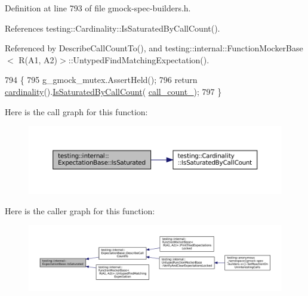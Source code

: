 Definition at line 793 of file gmock-\/spec-\/builders.\+h.



References testing\+::\+Cardinality\+::\+Is\+Saturated\+By\+Call\+Count().



Referenced by Describe\+Call\+Count\+To(), and testing\+::internal\+::\+Function\+Mocker\+Base$<$ R(\+A1, A2)$>$\+::\+Untyped\+Find\+Matching\+Expectation().


\begin{DoxyCode}
794                                                     \{
795     g\_gmock\_mutex.AssertHeld();
796     \textcolor{keywordflow}{return} \hyperlink{classtesting_1_1internal_1_1ExpectationBase_a1399efffbc8675510a15c6ba1f18184b}{cardinality}().\hyperlink{classtesting_1_1Cardinality_a57128ba46931e24a2b39af177e3346f8}{IsSaturatedByCallCount}(
      \hyperlink{classtesting_1_1internal_1_1ExpectationBase_aea95d46f7583566e3f7a081b0668ad4c}{call\_count\_});
797   \}
\end{DoxyCode}
Here is the call graph for this function\+:
\nopagebreak
\begin{figure}[H]
\begin{center}
\leavevmode
\includegraphics[width=350pt]{classtesting_1_1internal_1_1ExpectationBase_ad3e4340cedefdc24fce1478a8d6cab93_cgraph}
\end{center}
\end{figure}
Here is the caller graph for this function\+:
\nopagebreak
\begin{figure}[H]
\begin{center}
\leavevmode
\includegraphics[width=350pt]{classtesting_1_1internal_1_1ExpectationBase_ad3e4340cedefdc24fce1478a8d6cab93_icgraph}
\end{center}
\end{figure}
\mbox{\label{classtesting_1_1internal_1_1ExpectationBase_a6a44d831449d31e0e46d0070625b452c}} 
